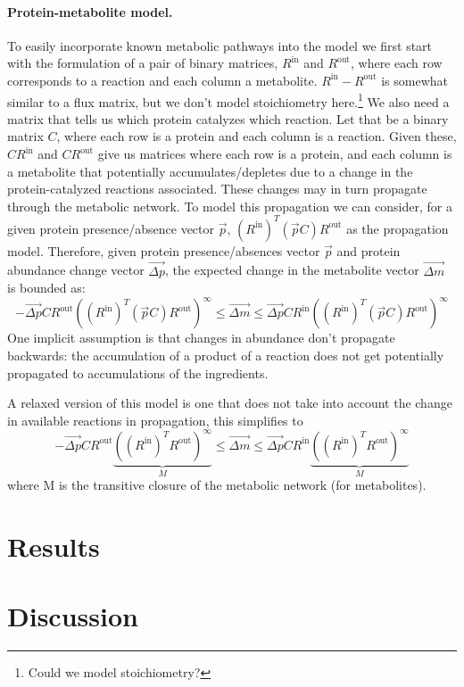\documentclass{article}
\begin{document}
\paragraph{Protein-metabolite model.}
To easily incorporate known metabolic pathways into the model we first start with the formulation of a pair of binary matrices, $R^\text{in}$ and $R^\text{out}$, where each row corresponds to a reaction and each column a metabolite.
$R^\text{in} - R^\text{out}$ is somewhat similar to a flux matrix, but we don't model stoichiometry here.\footnote{Could we model stoichiometry?}
We also need a matrix that tells us which protein catalyzes which reaction.
Let that be a binary matrix $C$, where each row is a protein and each column is a reaction.
Given these, $C R^\text{in}$ and $C R^\text{out}$ give us matrices where each row is a protein, and each column is a metabolite that potentially accumulates/depletes due to a change in the protein-catalyzed reactions associated.
These changes may in turn propagate through the metabolic network.
To model this propagation we can consider, for a given protein presence/absence vector $\vec p$, $(R^\text{in})^T ( \vec p C ) R^\text{out}$ as the propagation model.
Therefore, given protein presence/absences vector $\vec p$ and protein abundance change vector $\vec{\Delta p}$, the expected change in the metabolite vector $\vec{ \Delta m}$ is bounded as:
\[
 -\vec{\Delta p} C R^\text{out} ( (R^\text{in})^T ( \vec p C ) R^\text{out} )^\infty \leq \vec{ \Delta m} \leq \vec{\Delta p} C R^\text{in} ( (R^\text{in})^T ( \vec p C ) R^\text{out} )^\infty
\]
One implicit assumption is that changes in abundance don't propagate backwards: the accumulation of a product of a reaction does not get potentially propagated to accumulations of the ingredients.

A relaxed version of this model is one that does not take into account the change in available reactions in propagation, this simplifies to
\[
 -\vec{\Delta p} C R^\text{out} \underbrace{( (R^\text{in})^T R^\text{out} )^\infty}_M \leq \vec{ \Delta m} \leq \vec{\Delta p} C R^\text{in} \underbrace{( (R^\text{in})^T R^\text{out} )^\infty}_M
\]
where M is the transitive closure of the metabolic network (for metabolites).

\section{Results}

\section{Discussion}

\printbibliography
\end{document}
